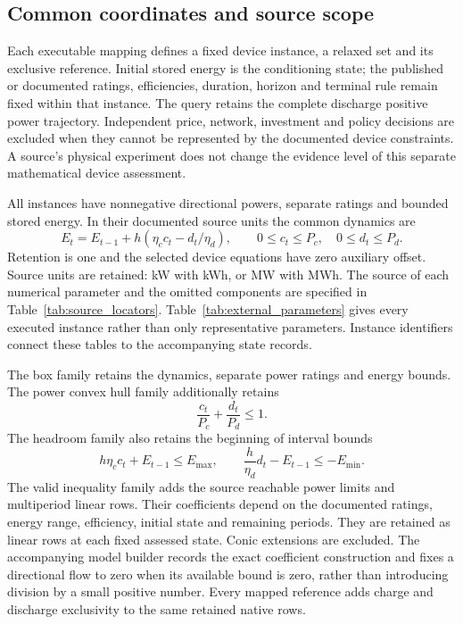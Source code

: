 \subsection{Common coordinates and source scope}
Each executable mapping defines a fixed device instance, a relaxed set and
its exclusive reference. Initial stored energy is the conditioning state;
the published or documented ratings, efficiencies, duration, horizon and
terminal rule remain fixed within that instance. The query retains the
complete discharge positive power trajectory. Independent price, network,
investment and policy decisions are excluded when they cannot be represented
by the documented device constraints. A source's physical experiment does
not change the evidence level of this separate mathematical device assessment.

All instances have nonnegative directional powers, separate ratings and
bounded stored energy. In their documented source units the common dynamics are
\begin{equation}
E_t=E_{t-1}+h(\eta_cc_t-d_t/\eta_d),\qquad
0\leq c_t\leq P_c,\quad 0\leq d_t\leq P_d .\label{eq:external_common}
\end{equation}
Retention is one and the selected device equations have zero auxiliary
offset. Source units are retained: kW with kWh, or MW with MWh.
The source of each numerical parameter and the omitted components are
specified in Table~\ref{tab:source_locators}. Table~\ref{tab:external_parameters}
gives every executed instance rather than only representative parameters.
Instance identifiers connect these tables to the accompanying state records.

The box family retains the dynamics, separate power ratings and energy
bounds. The power convex hull family additionally retains
\begin{equation}
\frac{c_t}{P_c}+\frac{d_t}{P_d}\leq 1 .\label{eq:external_hull}
\end{equation}
The headroom family also retains the beginning of interval bounds
\begin{equation}
h\eta_cc_t+E_{t-1}\leq E_{\max},\qquad
\frac{h}{\eta_d}d_t-E_{t-1}\leq-E_{\min} .\label{eq:external_headroom}
\end{equation}
The valid inequality family adds the source reachable power limits and
multiperiod linear rows. Their coefficients depend on the documented
ratings, energy range, efficiency, initial state and remaining periods.
They are retained as linear rows at each fixed assessed state. Conic
extensions are excluded. The accompanying model builder records the exact
coefficient construction and fixes a directional flow to zero when its
available bound is zero, rather than introducing division by a small positive
number. Every mapped reference adds charge and discharge exclusivity to the
same retained native rows.

